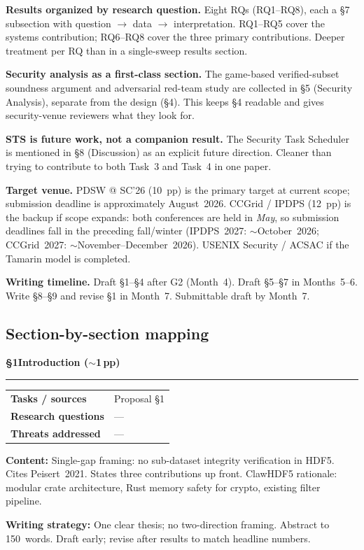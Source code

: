 \documentclass[11pt]{article}
\makeatletter
\newcommand{\mapsec}[3]{%
  \smallskip\noindent
  \begin{tabular}{@{}p{3.2cm}p{9.8cm}@{}}
  \toprule
  \textbf{Tasks / sources}    & #1 \\
  \textbf{Research questions} & #2 \\
  \textbf{Threats addressed}  & #3 \\
  \bottomrule
  \end{tabular}\smallskip}
\makeatother
\begin{document}
\textbf{Results organized by research question.}
Eight RQs (RQ1--RQ8), each a \S7 subsection with question $\rightarrow$ data $\rightarrow$
interpretation. RQ1--RQ5 cover the systems contribution; RQ6--RQ8 cover the three
primary contributions. Deeper treatment per RQ than in a single-sweep results section.

\textbf{Security analysis as a first-class section.}
The game-based verified-subset soundness argument and adversarial red-team study are collected in
\S5 (Security Analysis), separate from the design (\S4). This keeps \S4 readable and
gives security-venue reviewers what they look for.

\textbf{STS is future work, not a companion result.}
The Security Task Scheduler is mentioned in \S8 (Discussion) as an explicit future
direction. Cleaner than trying to contribute to both Task~3 and Task~4 in one paper.

\textbf{Target venue.} PDSW @ SC'26 (10~pp) is the primary target at current
scope; submission deadline is approximately August~2026. CCGrid / IPDPS
(12~pp) is the backup if scope expands: both conferences are held in
\emph{May}, so submission deadlines fall in the preceding fall/winter
(IPDPS~2027: $\sim$October~2026; CCGrid~2027: $\sim$November--December~2026).
USENIX Security / ACSAC if the Tamarin model is completed.

\textbf{Writing timeline.} Draft \S1--\S4 after G2 (Month~4). Draft \S5--\S7 in
Months~5--6. Write \S8--\S9 and revise \S1 in Month~7. Submittable draft by Month~7.

\bigskip
\subsection*{\textcolor{blue!60!black}{Section-by-section mapping}}

\noindent\textcolor{blue!60!black}{\textbf{\S1\quad Introduction \hfill($\sim$1\,pp)}}
\par\noindent\rule{\linewidth}{0.4pt}
\mapsec{Proposal \S1}{---}{---}

\noindent\textbf{Content:} Single-gap framing: no sub-dataset integrity verification in
HDF5. Cites Peisert~2021. States three contributions up front. ClawHDF5 rationale:
modular crate architecture, Rust memory safety for crypto, existing filter pipeline.

\noindent\textbf{Writing strategy:} One clear thesis; no two-direction framing. Abstract
to 150~words. Draft early; revise after results to match headline numbers.
\end{document}
